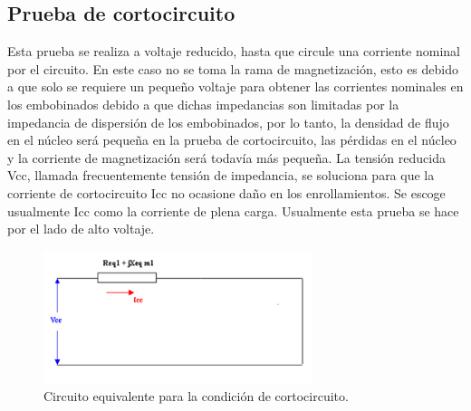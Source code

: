 \subsection{Prueba de cortocircuito}
Esta prueba se realiza a voltaje reducido, hasta que circule una corriente nominal por el circuito. En este caso no se toma la rama de magnetización, esto es debido a que solo se requiere un pequeño voltaje para obtener las corrientes nominales en los embobinados debido a que dichas impedancias son limitadas por la impedancia de dispersión de los embobinados, por lo tanto, la densidad de flujo en el núcleo será pequeña en la prueba de cortocircuito, las pérdidas en el núcleo y la corriente de magnetización será todavía más pequeña. La tensión reducida Vcc, llamada frecuentemente tensión de impedancia, se soluciona para que la corriente de cortocircuito Icc no ocasione daño en los enrollamientos. Se escoge usualmente Icc como la corriente de plena carga. Usualmente esta prueba se hace por el lado de alto voltaje.
\begin{figure}[H]
    \centering
    \includegraphics[width=0.7\textwidth]{equivalente_corto.png}
    \captionsetup{labelformat=empty}
    \caption{Circuito equivalente para la condición de cortocircuito.}
\end{figure}

